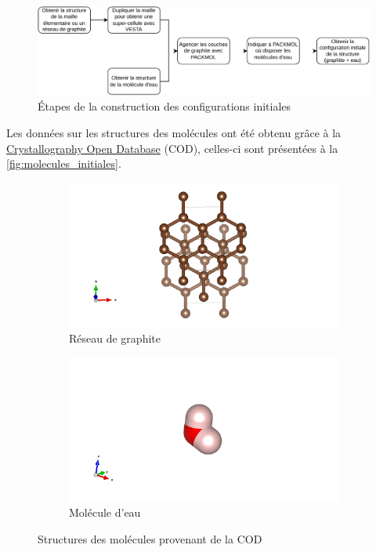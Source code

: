 \documentclass[11pt, a4paper]{article}
\begin{document}
\begin{figure}[hpbt]
	\centering
	\includegraphics[width=\linewidth]{construction-deroulement.pdf}
	\caption{Étapes de la construction des configurations initiales}
	\label{fig:deroulement}
\end{figure}

Les données sur les structures des molécules ont été obtenu grâce à la \href{http://www.crystallography.net/cod/}{Crystallography Open Database} (COD), celles-ci sont présentées à la \autoref{fig:molecules_initiales}.

\begin{figure}[hpbt]
	\centering
	\begin{subfigure}{\linewidth}
		\centering
		\includegraphics[scale=0.2]{graphite.png}
		\caption{Réseau de graphite}
	\end{subfigure}
	\begin{subfigure}{\linewidth}
		\centering
		\includegraphics[scale=0.2]{water.png}
		\caption{Molécule d'eau}
	\end{subfigure}
	\caption{Structures des molécules provenant de la COD}
	\label{fig:molecules_initiales}
\end{figure}
\end{document}
